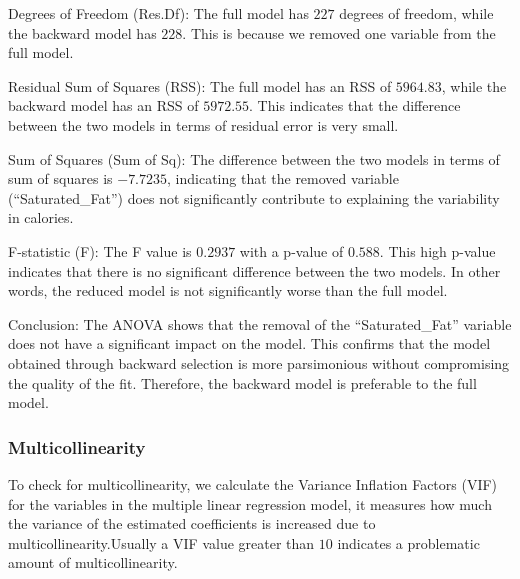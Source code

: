 \documentclass[
]{article}
\begin{document}
Degrees of Freedom (Res.Df): The full model has \(227\) degrees of
freedom, while the backward model has \(228\). This is because we
removed one variable from the full model.

Residual Sum of Squares (RSS): The full model has an RSS of \(5964.83\),
while the backward model has an RSS of \(5972.55\). This indicates that
the difference between the two models in terms of residual error is very
small.

Sum of Squares (Sum of Sq): The difference between the two models in
terms of sum of squares is \(-7.7235\), indicating that the removed
variable (``Saturated\_Fat'') does not significantly contribute to
explaining the variability in calories.

F-statistic (F): The F value is \(0.2937\) with a p-value of \(0.588\).
This high p-value indicates that there is no significant difference
between the two models. In other words, the reduced model is not
significantly worse than the full model.

Conclusion: The ANOVA shows that the removal of the ``Saturated\_Fat''
variable does not have a significant impact on the model. This confirms
that the model obtained through backward selection is more parsimonious
without compromising the quality of the fit. Therefore, the backward
model is preferable to the full model.

\hypertarget{multicollinearity}{%
\subsubsection{Multicollinearity}\label{multicollinearity}}

To check for multicollinearity, we calculate the Variance Inflation
Factors (VIF) for the variables in the multiple linear regression model,
it measures how much the variance of the estimated coefficients is
increased due to multicollinearity.Usually a VIF value greater than
\(10\) indicates a problematic amount of multicollinearity.
\end{document}
